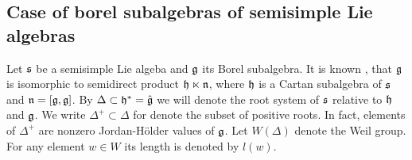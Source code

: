 \subsection{Case of borel subalgebras of semisimple Lie algebras}

Let $\mathfrak{s}$ be a semisimple Lie algeba and $\mathfrak{g}$ its Borel subalgebra. It is known
\cite{humphreys}, that $\mathfrak{g}$ is isomorphic to semidirect product $\mathfrak{h} \ltimes \mathfrak{n}$, where
$\mathfrak{h}$ is a Cartan subalgebra of $\mathfrak{s}$ and $\mathfrak{n} = [\mathfrak{g}, \mathfrak{g}]$. By $\Delta \subset \mathfrak{h}^*
= \hat{\mathfrak{g}}$ we will denote the root system of $\mathfrak{s}$ relative to $\mathfrak{h}$ and $\mathfrak{g}$. We write
$\Delta^+ \subset \Delta$ for denote the subset of positive roots. In fact, elements of $\Delta^+$
are nonzero Jordan-H\"older values of $\mathfrak{g}$. Let $W(\Delta)$ denote the Weil group. For any
element $w\in W$ its length is denoted by $l(w)$. 


